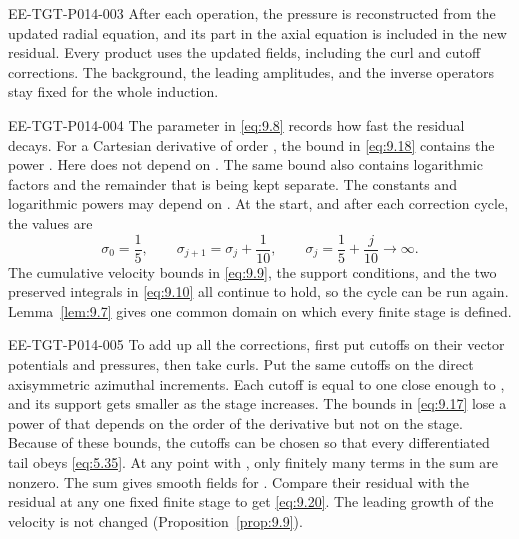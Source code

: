 \begin{EESegment}{EE-TGT-P014-003}
After each operation, the pressure is reconstructed from the updated radial equation, and
its part in the axial equation is included in the new residual. Every product uses the
updated fields, including the curl and cutoff corrections. The background, the leading
amplitudes, and the inverse operators stay fixed for the whole induction.
\end{EESegment}

\begin{EESegment}{EE-TGT-P014-004}
The parameter  in \eqref{eq:9.8} records how fast the residual
decays. For a Cartesian derivative of order , the bound in
\eqref{eq:9.18} contains the power
. Here
 does not depend on
. The same bound also contains logarithmic factors and the remainder
that is being kept separate. The constants and logarithmic powers may depend on
. At the start, and after each correction cycle, the values are
\[
\sigma_0=\frac15,
\qquad
\sigma_{j+1}=\sigma_j+\frac1{10},
\qquad
\sigma_j=\frac15+\frac j{10}\longrightarrow\infty.
\]
The cumulative velocity bounds in \eqref{eq:9.9}, the support conditions, and the two
preserved integrals in \eqref{eq:9.10} all continue to hold, so the cycle can be run again.
Lemma~\ref{lem:9.7} gives one common domain on which every finite stage is defined.
\end{EESegment}

\begin{EESegment}{EE-TGT-P014-005}
To add up all the corrections, first put cutoffs on their vector potentials and pressures,
then take curls. Put the same cutoffs on the direct axisymmetric azimuthal increments. Each
cutoff is equal to one close enough to , and its support gets smaller
as the stage increases. The bounds in \eqref{eq:9.17} lose a power of
 that depends on the order of the derivative but not on the stage.
Because of these bounds, the cutoffs can be chosen so that every differentiated tail obeys
\eqref{eq:5.35}. At any point with , only finitely many terms in the
sum are nonzero. The sum gives smooth fields
 for
. Compare their residual with the residual at any one fixed finite
stage to get \eqref{eq:9.20}. The leading growth of the velocity is not changed
(Proposition~\ref{prop:9.9}).
\end{EESegment}

